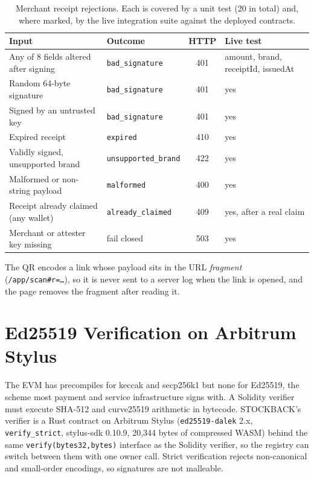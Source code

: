 \documentclass[10.5pt,letterpaper]{article}
\theoremstyle{definition}
\theoremstyle{remark}
\newcommand{\ttt}[1]{\texttt{#1}}
\begin{document}
\begin{table}[!htb]
\centering\small
\caption{Merchant receipt rejections. Each is covered by a unit test (20 in total) and, where marked, by the live
integration suite against the deployed contracts.}
\label{tab:reject}
\begin{tabular}{@{}llcl@{}}
\toprule
Input & Outcome & HTTP & Live test\\
\midrule
Any of 8 fields altered after signing & \texttt{bad\_signature} & 401 & amount, brand, receiptId, issuedAt\\
Random 64-byte signature & \texttt{bad\_signature} & 401 & yes\\
Signed by an untrusted key & \texttt{bad\_signature} & 401 & yes\\
Expired receipt & \texttt{expired} & 410 & yes\\
Validly signed, unsupported brand & \texttt{unsupported\_brand} & 422 & yes\\
Malformed or non-string payload & \texttt{malformed} & 400 & yes\\
Receipt already claimed (any wallet) & \texttt{already\_claimed} & 409 & yes, after a real claim\\
Merchant or attester key missing & fail closed & 503 & yes\\
\bottomrule
\end{tabular}
\end{table}

The QR encodes a link whose payload sits in the URL \emph{fragment} (\ttt{/app/scan\#r=\dots}), so it is never sent to a
server log when the link is opened, and the page removes the fragment after reading it.

\section{Ed25519 Verification on Arbitrum Stylus}\label{sec:stylus}

The EVM has precompiles for keccak and secp256k1 but none for Ed25519, the scheme most payment and service
infrastructure signs with. A Solidity verifier must execute SHA-512 and curve25519 arithmetic in bytecode. STOCKBACK's
verifier is a Rust contract on Arbitrum Stylus (\ttt{ed25519-dalek} 2.x, \ttt{verify\_strict}, stylus-sdk 0.10.9,
20{,}344 bytes of compressed WASM) behind the same \ttt{verify(bytes32,bytes)} interface as the Solidity verifier, so the
registry can switch between them with one owner call. Strict verification rejects non-canonical and small-order
encodings, so signatures are not malleable.
\end{document}
